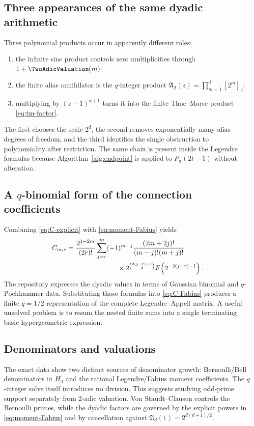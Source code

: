 \documentclass[11pt,oneside]{article}
\theoremstyle{definition}
\theoremstyle{remark}
\begin{document}
\subsection{Three appearances of the same dyadic arithmetic}
Three polynomial products occur in apparently different roles:
\begin{enumerate}
\item the infinite sinc product controls zero multiplicities through
$1+\TwoAdicValuation(m)$;
\item the finite alias annihilator is the $q$-integer product
$\mathfrak A_d(z)=\prod_{m=1}^d[2^m]_z$;
\item multiplying by $(z-1)^{d+1}$ turns it into the finite Thue--Morse
product \eqref{eq:tm-factor}.
\end{enumerate}
The first chooses the scale $2^d$, the second removes exponentially many
alias degrees of freedom, and the third identifies the single obstruction to
polynomiality after restriction.  The same chain is present inside the
Legendre formulas because Algorithm~\ref{alg:endpoint} is applied to
$P_n(2t-1)$ without alteration.

\subsection{A $q$-binomial form of the connection coefficients}
Combining \eqref{eq:C-explicit} with \eqref{eq:moment-Fabius} yields
\begin{align}
 C_{m,r}
 &=\frac{2^{1-2m}}{(2r)!}
 \sum_{j=r}^{m}(-1)^{m-j}
 \frac{(2m+2j)!}{(m-j)!(m+j)!}\notag\\
 &\hspace{26mm}\times
 2^{\binom{2(j-r)+1}{2}}
 F\!\left(2^{-2(j-r)-1}\right).
 \label{eq:C-Fabius}
\end{align}
The repository expresses the dyadic values in terms of Gaussian binomial and
$q$-Pochhammer data.  Substituting those formulas into
\eqref{eq:C-Fabius} produces a finite $q=1/2$ representation of the complete
Legendre--Appell matrix.  A useful unsolved problem is to resum the nested
finite sums into a single terminating basic hypergeometric expression.

\subsection{Denominators and valuations}
The exact data show two distinct sources of denominator growth:
Bernoulli/Bell denominators in $H_d$ and the rational Legendre/Fabius moment
coefficients.  The $q$-integer solve itself introduces no division.  This
suggests studying odd-prime support separately from $2$-adic valuation.
Von Staudt--Clausen controls the Bernoulli primes, while the dyadic factors are
governed by the explicit powers in \eqref{eq:moment-Fabius} and by cancellation
against $\mathfrak A_d(1)=2^{d(d+1)/2}$.
\end{document}
